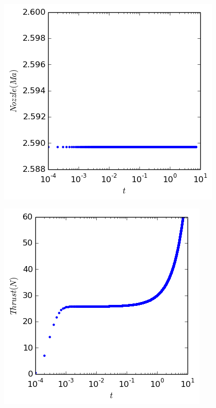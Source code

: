 \documentclass[cleanfoot,cleanhead,twocolumn,10pt,notitlepage]{asme2e}
\begin{document}
\includegraphics[width=\linewidth]{../python_stuff/Part1/NozzMach.png}

\includegraphics[width=\linewidth]{../python_stuff/Part1/Thrust.png}
\end{document}
